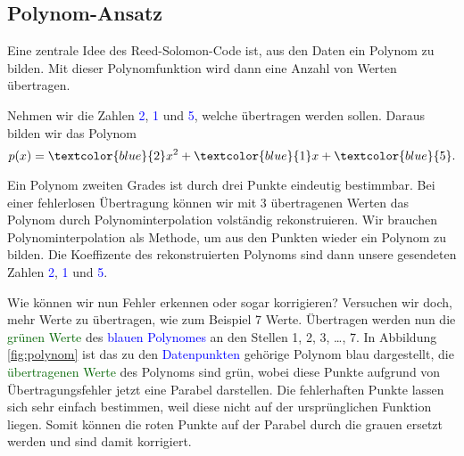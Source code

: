 \subsection{Polynom-Ansatz
\label{reedsolomon:section:polynomansatz}}
Eine zentrale Idee des Reed-Solomon-Code ist, aus den Daten ein Polynom zu bilden. 
Mit dieser Polynomfunktion wird dann eine Anzahl von Werten übertragen.
\begin{beispiel} Nehmen wir die Zahlen \textcolor{blue}{2}, \textcolor{blue}{1} und \textcolor{blue}{5}, welche übertragen werden sollen. Daraus bilden wir das Polynom
\begin{equation}
p(x)
=
\textcolor{blue}{2}x^2 + \textcolor{blue}{1}x + \textcolor{blue}{5}.
\label{reedsolomon:equation1}
\end{equation}
\par 
Ein Polynom zweiten Grades ist durch drei Punkte eindeutig bestimmbar. 
Bei einer fehlerlosen Übertragung können wir mit 3 übertragenen Werten
    das Polynom durch Polynominterpolation volständig rekonstruieren.
Wir brauchen Polynominterpolation als Methode, um aus den Punkten wieder ein Polynom zu bilden.
Die Koeffizente des rekonstruierten Polynoms sind dann unsere gesendeten Zahlen \textcolor{blue}{2}, \textcolor{blue}{1} und \textcolor{blue}{5}.
\par 
Wie können wir nun Fehler erkennen oder sogar korrigieren?
Versuchen wir doch, mehr Werte zu übertragen, wie zum Beispiel 7 Werte. 
Übertragen werden nun die \textcolor{darkgreen}{grünen Werte} 
    des \textcolor{blue}{blauen Polynomes} an den Stellen 1, 2, 3, \dots , 7.
In Abbildung \ref{fig:polynom} ist das zu den \textcolor{blue}{Datenpunkten} gehörige Polynom blau dargestellt,
die \textcolor{darkgreen}{übertragenen Werte} des Polynoms sind grün, wobei diese Punkte aufgrund von Übertragungsfehler jetzt eine Parabel darstellen. 
Die fehlerhaften Punkte lassen sich sehr einfach bestimmen, weil diese nicht auf der ursprünglichen Funktion liegen. 
Somit können die roten Punkte auf der Parabel durch die grauen ersetzt werden und sind damit korrigiert. 


\end{beispiel}
